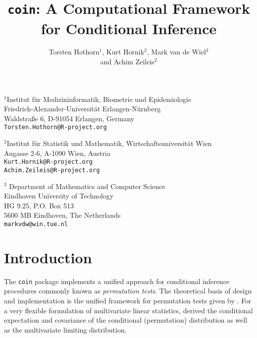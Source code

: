 \documentclass[letter]{article}
\begin{document}
\title{\texttt{coin}: A Computational Framework for Conditional Inference}
\author{Torsten Hothorn$^1$, Kurt Hornik$^2$, Mark van de Wiel$^3$ \\
        and Achim Zeileis$^2$}
\date{}
\maketitle

\noindent$^1$Institut f\"ur Medizininformatik, Biometrie und Epidemiologie\\
     Friedrich-Alexander-Universit\"at Erlangen-N\"urnberg\\
     Waldstra{\ss}e 6, D-91054 Erlangen, Germany \\
     \texttt{Torsten.Hothorn@R-project.org}
\newline

\noindent$^2$Institut f\"ur Statistik und Mathematik,
             Wirtschaftsuniversit\"at Wien \\
       Augasse 2-6, A-1090 Wien, Austria \\
       \texttt{Kurt.Hornik@R-project.org} \\
       \texttt{Achim.Zeileis@R-project.org} 
\newline

\noindent$^3$ Department of Mathematics and Computer Science \\
              Eindhoven University of Technology \\
              HG 9.25, P.O. Box 513 \\
              5600 MB Eindhoven, The Netherlands \\
              \texttt{markvdw@win.tue.nl}
\newline


\section{Introduction}

The \texttt{coin} package implements a unified approach for conditional
inference procedures commonly known as \textit{permutation tests}.
The theoretical basis of design and implementation is the unified 
framework for permutation tests given by \cite{StrasserWeber1999}. For a
very flexible formulation of multivariate linear statistics,
\cite{StrasserWeber1999} derived the conditional expectation and covariance
of the conditional (permutation) distribution as well as the multivariate 
limiting distribution. 
\end{document}

